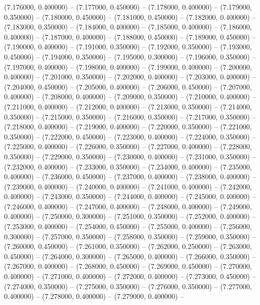 (7.176000, 0.400000) -- 
(7.177000, 0.450000) -- 
(7.178000, 0.400000) -- 
(7.179000, 0.350000) -- 
(7.180000, 0.450000) -- 
(7.181000, 0.450000) -- 
(7.182000, 0.400000) -- 
(7.183000, 0.350000) -- 
(7.184000, 0.400000) -- 
(7.185000, 0.400000) -- 
(7.186000, 0.400000) -- 
(7.187000, 0.400000) -- 
(7.188000, 0.450000) -- 
(7.189000, 0.450000) -- 
(7.190000, 0.400000) -- 
(7.191000, 0.350000) -- 
(7.192000, 0.350000) -- 
(7.193000, 0.450000) -- 
(7.194000, 0.350000) -- 
(7.195000, 0.300000) -- 
(7.196000, 0.350000) -- 
(7.197000, 0.400000) -- 
(7.198000, 0.400000) -- 
(7.199000, 0.400000) -- 
(7.200000, 0.400000) -- 
(7.201000, 0.350000) -- 
(7.202000, 0.400000) -- 
(7.203000, 0.400000) -- 
(7.204000, 0.450000) -- 
(7.205000, 0.400000) -- 
(7.206000, 0.450000) -- 
(7.207000, 0.400000) -- 
(7.208000, 0.400000) -- 
(7.209000, 0.350000) -- 
(7.210000, 0.400000) -- 
(7.211000, 0.400000) -- 
(7.212000, 0.400000) -- 
(7.213000, 0.350000) -- 
(7.214000, 0.350000) -- 
(7.215000, 0.350000) -- 
(7.216000, 0.350000) -- 
(7.217000, 0.350000) -- 
(7.218000, 0.400000) -- 
(7.219000, 0.400000) -- 
(7.220000, 0.350000) -- 
(7.221000, 0.350000) -- 
(7.222000, 0.450000) -- 
(7.223000, 0.400000) -- 
(7.224000, 0.350000) -- 
(7.225000, 0.400000) -- 
(7.226000, 0.350000) -- 
(7.227000, 0.400000) -- 
(7.228000, 0.350000) -- 
(7.229000, 0.350000) -- 
(7.230000, 0.400000) -- 
(7.231000, 0.350000) -- 
(7.232000, 0.400000) -- 
(7.233000, 0.350000) -- 
(7.234000, 0.400000) -- 
(7.235000, 0.400000) -- 
(7.236000, 0.450000) -- 
(7.237000, 0.400000) -- 
(7.238000, 0.400000) -- 
(7.239000, 0.400000) -- 
(7.240000, 0.400000) -- 
(7.241000, 0.400000) -- 
(7.242000, 0.400000) -- 
(7.243000, 0.350000) -- 
(7.244000, 0.400000) -- 
(7.245000, 0.400000) -- 
(7.246000, 0.400000) -- 
(7.247000, 0.400000) -- 
(7.248000, 0.400000) -- 
(7.249000, 0.400000) -- 
(7.250000, 0.300000) -- 
(7.251000, 0.350000) -- 
(7.252000, 0.400000) -- 
(7.253000, 0.400000) -- 
(7.254000, 0.450000) -- 
(7.255000, 0.400000) -- 
(7.256000, 0.300000) -- 
(7.257000, 0.350000) -- 
(7.258000, 0.350000) -- 
(7.259000, 0.350000) -- 
(7.260000, 0.450000) -- 
(7.261000, 0.350000) -- 
(7.262000, 0.250000) -- 
(7.263000, 0.450000) -- 
(7.264000, 0.300000) -- 
(7.265000, 0.400000) -- 
(7.266000, 0.350000) -- 
(7.267000, 0.400000) -- 
(7.268000, 0.450000) -- 
(7.269000, 0.450000) -- 
(7.270000, 0.400000) -- 
(7.271000, 0.400000) -- 
(7.272000, 0.400000) -- 
(7.273000, 0.450000) -- 
(7.274000, 0.350000) -- 
(7.275000, 0.350000) -- 
(7.276000, 0.350000) -- 
(7.277000, 0.400000) -- 
(7.278000, 0.400000) -- 
(7.279000, 0.400000) -- 
